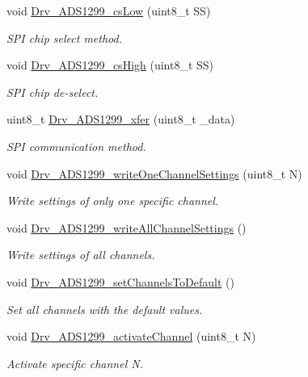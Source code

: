 \begin{DoxyCompactItemize}
void \hyperlink{group___a_d_s1299___library_gae7bfe7b22c142ad6af3606fc094dd149}{Drv\+\_\+\+A\+D\+S1299\+\_\+cs\+Low} (uint8\+\_\+t S\+S)
\begin{DoxyCompactList}\small\item\em S\+P\+I chip select method. \end{DoxyCompactList}\item 
void \hyperlink{group___a_d_s1299___library_gad90e09cf6259d704d03a6b3f569d0976}{Drv\+\_\+\+A\+D\+S1299\+\_\+cs\+High} (uint8\+\_\+t S\+S)
\begin{DoxyCompactList}\small\item\em S\+P\+I chip de-\/select. \end{DoxyCompactList}\item 
uint8\+\_\+t \hyperlink{group___a_d_s1299___library_gaacd804d5af6ab72174a9cb050dcf9041}{Drv\+\_\+\+A\+D\+S1299\+\_\+xfer} (uint8\+\_\+t \+\_\+data)
\begin{DoxyCompactList}\small\item\em S\+P\+I communication method. \end{DoxyCompactList}\item 
void \hyperlink{group___a_d_s1299___library_gab10b419566b34fa502514a113505312d}{Drv\+\_\+\+A\+D\+S1299\+\_\+write\+One\+Channel\+Settings} (uint8\+\_\+t N)
\begin{DoxyCompactList}\small\item\em Write settings of only one specific channel. \end{DoxyCompactList}\item 
void \hyperlink{group___a_d_s1299___library_ga6191cb19901b35ad7f9e5d999064dac3}{Drv\+\_\+\+A\+D\+S1299\+\_\+write\+All\+Channel\+Settings} ()
\begin{DoxyCompactList}\small\item\em Write settings of all channels. \end{DoxyCompactList}\item 
void \hyperlink{group___a_d_s1299___library_gada2653d98d54cb667537d468a5a3e4ce}{Drv\+\_\+\+A\+D\+S1299\+\_\+set\+Channels\+To\+Default} ()
\begin{DoxyCompactList}\small\item\em Set all channels with the default values. \end{DoxyCompactList}\item 
void \hyperlink{group___a_d_s1299___library_ga265dd2d7a4bd35e681d566e3a2c517ce}{Drv\+\_\+\+A\+D\+S1299\+\_\+activate\+Channel} (uint8\+\_\+t N)
\begin{DoxyCompactList}\small\item\em Activate specific channel N. \end{DoxyCompactList}\item 

\end{DoxyCompactItemize}
